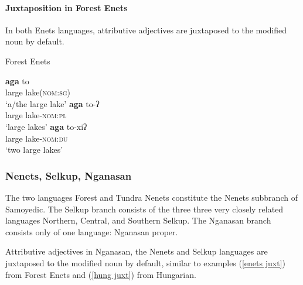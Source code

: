 \paragraph*{Juxtaposition in Forest Enets}
In both Enets languages, attributive adjectives are juxtaposed to the modified noun by default.
\begin{exe}
\label{enets juxt}
\ex \rm{Forest Enets  \citep[71]{siegl2013a}}
\begin{xlist}
\ex 
\gll	\textbf{aga} to\\
	large lake(\textsc{nom:sg})\\
\glt	‘a/the large lake’
\ex 
\gll	\textbf{aga} to-ʔ\\
	large lake\textsc{-nom:pl}\\
\glt	‘large lakes’
\ex 
\gll	\textbf{aga} to-xiʔ\\
	large lake\textsc{-nom:du}\\
\glt	‘two large lakes’
\end{xlist}
\end{exe}

\subsubsection{Nenets, Selkup, Nganasan}
The two languages Forest and Tundra Nenets constitute the Nenets subbranch of Samoyedic. The Selkup branch consists of the three three very closely related languages Northern, Central, and Southern Selkup. The Nganasan branch consists only of one language: Nganasan proper.

Attributive adjectives in Nganasan, the Nenets and Selkup languages are juxtaposed to the modified noun by default, similar to examples (\ref{enets juxt}) from Forest Enets and (\ref{hung juxt}) from Hungarian.

